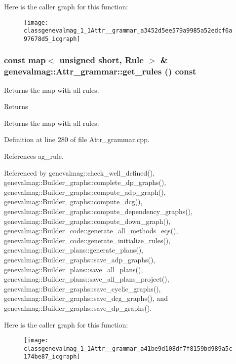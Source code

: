 Here is the caller graph for this function:\nopagebreak
\begin{figure}[H]
\begin{center}
\leavevmode
\texttt{[image: classgenevalmag\_1\_1Attr\_\_grammar\_a3452d5ee579a9985a52edcf6a97678d5\_icgraph]}
\end{center}
\end{figure}


\hypertarget{classgenevalmag_1_1Attr__grammar_a41be9d108df7f8159bd989a5c174be87}{
\subsubsection[{get\_\-rules}]{\setlength{\rightskip}{0pt plus 5cm}const map$<$ unsigned short, {\bf Rule} $>$ \& genevalmag::Attr\_\-grammar::get\_\-rules () const}}
\label{classgenevalmag_1_1Attr__grammar_a41be9d108df7f8159bd989a5c174be87}
Returns the map with all rules. \begin{DoxyReturn}{Returns}

\end{DoxyReturn}
Returns the map with all rules. 

Definition at line 280 of file Attr\_\-grammar.cpp.



References ag\_\-rule.



Referenced by genevalmag::check\_\-well\_\-defined(), genevalmag::Builder\_\-graphs::complete\_\-dp\_\-graphs(), genevalmag::Builder\_\-graphs::compute\_\-adp\_\-graph(), genevalmag::Builder\_\-graphs::compute\_\-dcg(), genevalmag::Builder\_\-graphs::compute\_\-dependency\_\-graphs(), genevalmag::Builder\_\-graphs::compute\_\-down\_\-graph(), genevalmag::Builder\_\-code::generate\_\-all\_\-methods\_\-eqs(), genevalmag::Builder\_\-code::generate\_\-initialize\_\-rules(), genevalmag::Builder\_\-plans::generate\_\-plans(), genevalmag::Builder\_\-graphs::save\_\-adp\_\-graphs(), genevalmag::Builder\_\-plans::save\_\-all\_\-plans(), genevalmag::Builder\_\-plans::save\_\-all\_\-plans\_\-project(), genevalmag::Builder\_\-graphs::save\_\-cyclic\_\-graphs(), genevalmag::Builder\_\-graphs::save\_\-dcg\_\-graphs(), and genevalmag::Builder\_\-graphs::save\_\-dp\_\-graphs().



Here is the caller graph for this function:\nopagebreak
\begin{figure}[H]
\begin{center}
\leavevmode
\texttt{[image: classgenevalmag\_1\_1Attr\_\_grammar\_a41be9d108df7f8159bd989a5c174be87\_icgraph]}
\end{center}
\end{figure}


